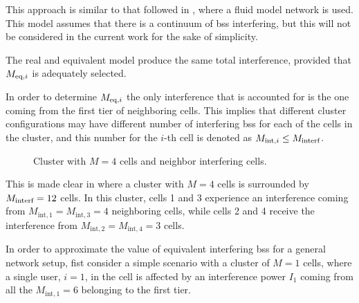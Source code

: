 This approach is similar to that followed in \cite{cheikh11}, where a fluid
model network is used. This model assumes that there is a continuum of
\glspl{bs} interfering, but this will not be considered in the current work for
the sake of simplicity.

The real and equivalent model produce the same total interference, provided that
$M_{\text{eq},i}$ is adequately selected.

In order to determine $M_{\text{eq},i}$ the only interference that is accounted for is the
one coming from the first tier of neighboring cells. This implies that different
cluster configurations may have different number of interfering \glspl{bs} for
each of the cells in the cluster, and this number for the $i$-th cell is denoted
as $M_{\text{int},i} \leq M_{\text{interf}}$.

\begin{figure}[t]
\begin{center}
    \hspace*{-8mm}
\end{center}
\caption{Cluster with $M=4$ cells and neighbor interfering cells.}
\label{fig:cluster_interf_cells}
\end{figure}

This is made clear in  where a cluster with
$M = 4$ cells is surrounded by $M_{\text{interf}} = 12$ cells. In this cluster, cells 1
and 3 experience an interference coming from $M_{\text{int}, 1} =
M_{\text{int}, 3} = 4$ neighboring cells, while cells 2 and 4 receive the
interference from $M_{\text{int}, 2} = M_{\text{int}, 4} = 3$ cells.

In order to approximate the value of equivalent interfering \glspl{bs} for a
general network setup, fist consider a simple scenario  with
a cluster of $M = 1$ cells, where a single user, $i = 1$, in the cell is
affected by an interference power $I_1$ coming from all the
$M_{\text{int}, 1} = 6$ belonging to the first tier.

